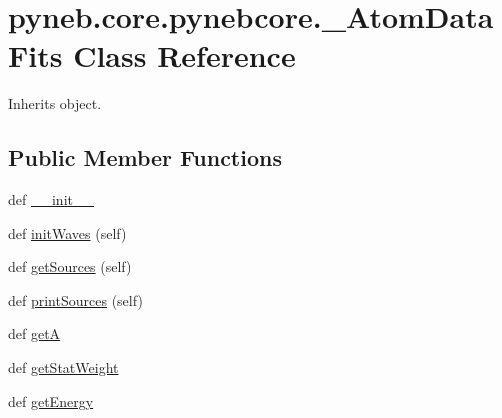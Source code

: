 \hypertarget{classpyneb_1_1core_1_1pynebcore_1_1___atom_data_fits}{}\section{pyneb.\+core.\+pynebcore.\+\_\+\+Atom\+Data\+Fits Class Reference}
\label{classpyneb_1_1core_1_1pynebcore_1_1___atom_data_fits}


Inherits object.

\subsection*{Public Member Functions}
\begin{DoxyCompactItemize}
\item 
def \hyperlink{classpyneb_1_1core_1_1pynebcore_1_1___atom_data_fits_a626724a08fd24ba2ea2b44307ec6b294}{\+\_\+\+\_\+init\+\_\+\+\_\+}
\item 
def \hyperlink{classpyneb_1_1core_1_1pynebcore_1_1___atom_data_fits_a28df203664408392ddb6bb301e46f6a4}{init\+Waves} (self)
\item 
def \hyperlink{classpyneb_1_1core_1_1pynebcore_1_1___atom_data_fits_a798f0a704adc5f8de86ea22cbd40fb81}{get\+Sources} (self)
\item 
def \hyperlink{classpyneb_1_1core_1_1pynebcore_1_1___atom_data_fits_a7307e0d4863dc562369df1b7e6d5ac1b}{print\+Sources} (self)
\item 
def \hyperlink{classpyneb_1_1core_1_1pynebcore_1_1___atom_data_fits_a4ecca5287d3b6bf0d6e44b9bb184db77}{get\+A}
\item 
def \hyperlink{classpyneb_1_1core_1_1pynebcore_1_1___atom_data_fits_ad0edb5ef48a2f1acdb0d02890aeeb4b6}{get\+Stat\+Weight}
\item 
def \hyperlink{classpyneb_1_1core_1_1pynebcore_1_1___atom_data_fits_ade643ddf8307c8068ad52b9500d894ce}{get\+Energy}
\end{DoxyCompactItemize}
